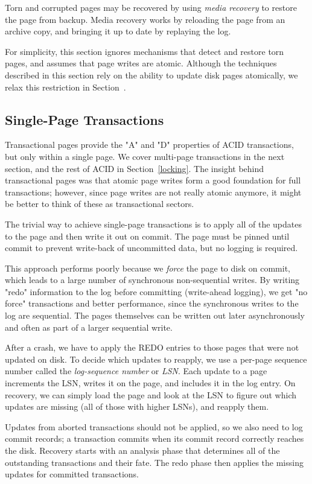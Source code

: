 \documentclass[letterpaper,twocolumn,10pt]{article}
\begin{document}
Torn and corrupted pages may be recovered by using {\em media
recovery} to restore the page from backup.  Media recovery works by
reloading the page from an archive copy, and bringing it up to date by
replaying the log.

For simplicity, this section ignores mechanisms that detect
and restore torn pages, and assumes that page writes are atomic.
Although the techniques described in this section rely on the ability to
update disk pages atomically, we relax this restriction in Section~\cite{sec:lsn-free}.

\subsection{Single-Page Transactions}

Transactional pages provide the "A" and "D" properties
of ACID transactions, but only within a single page.  We cover
multi-page transactions in the next section, and the rest of ACID in
Section~\ref{locking}.  The insight behind transactional pages was
that atomic page writes form a good foundation for full transactions;
however, since page writes are not really atomic anymore, it might be
better to think of these as transactional sectors.

The trivial way to achieve single-page transactions is to apply all of
the updates to the page and then write it out on commit.  The page
must be pinned until commit to prevent write-back of uncommitted data,
but no logging is required.

This approach performs poorly because we {\em force} the page to disk
on commit, which leads to a large number of synchronous non-sequential
writes.  By writing "redo" information to the log before committing
(write-ahead logging), we get "no force" transactions and better
performance, since the synchronous writes to the log are sequential.
The pages themselves can be written out later asynchronously and often
as part of a larger sequential write.

After a crash, we have to apply the REDO entries to those pages that
were not updated on disk.  To decide which updates to reapply, we use
a per-page sequence number called the {\em log-sequence number} or
{\em LSN}. Each update to a page increments the LSN, writes it on the
page, and includes it in the log entry.  On recovery, we can simply
load the page and look at the LSN to figure out which updates are missing
(all of those with higher LSNs), and reapply them.

Updates from aborted transactions should not be applied, so we also
need to log commit records; a transaction commits when its commit
record correctly reaches the disk. Recovery starts with an analysis
phase that determines all of the outstanding transactions and their
fate.  The redo phase then applies the missing updates for committed
transactions.
\end{document}
